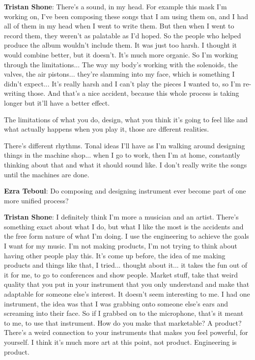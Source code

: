 \textbf{Tristan Shone}: There's a sound, in my head. For example this mask I'm working on, I've been composing these songs that I am using them on, and I had all of them in my head when I went to write them. But then when I went to record them, they weren't as palatable as I'd hoped. So the people who helped produce the album wouldn't include them. It was just too harsh. I thought it would combine better, but it doesn't. It's much more organic. So I'm working through the limitations... The way my body's working with the solenoids, the valves, the air pistons... they're slamming into my face, which is something I didn't expect... It's really harsh and I can't play the pieces I wanted to, so I'm re-writing those. And that's a nice accident, because this whole process is taking longer but it'll have a better effect. 

The limitations of what you do, design, what you think it's going to feel like and what actually happens when you play it, those are dfferent realities. 

There's different rhythms. Tonal ideas I'll have as I'm walking around designing things in the machine shop... when I go to work, then I'm at home, constantly thinking about that and what it should sound like. I don't really write the songs until the machines are done. 

\textbf{Ezra Teboul}: Do composing and designing instrument ever become part of one more unified process? 

\textbf{Tristan Shone}: I definitely think I'm more a musician and an artist. There's something exact about what I do, but what I like the most is the accidents and the free form nature of what I'm doing. I use the engineering to achieve the goals I want for my music. I'm not making products, I'm not trying to think about having other people play this. It's come up before, the idea of me making products and things like that, I tried... thought about it... it takes the fun out of it for me, to go to conferences and show people. Market stuff, take that weird quality that you put in your instrument that you only understand and make that adaptable for someone else's interest. It doesn't seem interesting to me. I had one instrument, the idea was that I was grabbing onto someone else's ears and screaming into their face. So if I grabbed on to the microphone, that's it meant to me, to use that instrument. How do you make that marketable? A product? There's a weird connection to your instruments that makes you feel powerful, for yourself. I think it's much more art at this point, not product. Engineering is product. 

